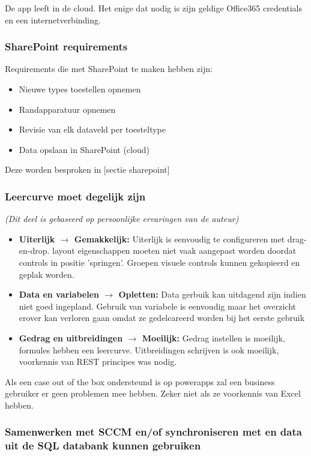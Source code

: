 De app leeft in de cloud. Het enige dat nodig is zijn geldige Office365 credentials en een internetverbinding.

\subsubsection{SharePoint requirements}

Requirements die met SharePoint te maken hebben zijn:
\begin{itemize}
    \item Nieuwe types toestellen opnemen
    \item Randapparatuur opnemen
    \item Revisie van elk dataveld per toesteltype
    \item Data opslaan in SharePoint (cloud)
\end{itemize}
Deze worden besproken in [sectie sharepoint]

\subsubsection{Leercurve moet degelijk zijn}
\textit{(Dit deel is gebaseerd op persoonlijke ervaringen van de auteur)}

\begin{itemize}
    \item \textbf{Uiterlijk $\rightarrow$ Gemakkelijk:} Uiterlijk is eenvoudig te configureren met drag-en-drop. layout eigenschappen moeten niet vaak aangepast worden doordat controls in positie 'springen'. Groepen visuele controls kunnen gekopieerd en geplak worden.
    \item \textbf{Data en variabelen $\rightarrow$ Opletten:} Data gerbuik kan uitdagend zijn indien niet goed ingepland. Gebruik van variabele is eenvoudig maar het overzicht erover kan verloren gaan omdat ze gedelcareerd worden bij het eerste gebruik
    \item \textbf{Gedrag en uitbreidingen $\rightarrow$ Moeilijk:} Gedrag instellen is moeilijk, formules hebben een leercurve. Uitbreidingen schrijven is ook moeilijk, voorkennis van REST principes was nodig.
\end{itemize}

Als een case out of the box ondersteund is op powerapps zal een business gebruiker er geen problemen mee hebben. Zeker niet als ze voorkennis van Excel hebben.

\subsubsection{Samenwerken met SCCM en/of synchroniseren met en data uit de SQL databank kunnen gebruiken}

